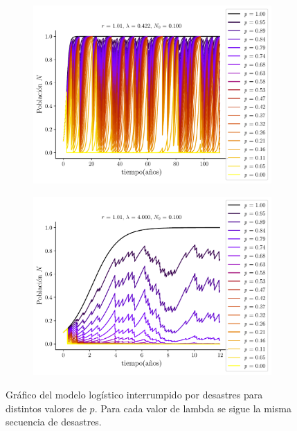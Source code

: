 \documentclass[twocolumn,aps,prl]{revtex4-1}
\begin{document}
\begin{figure}[ht!]
    \centering
    \begin{subfigure}[b]{0.495\linewidth}
        \centering
        \includegraphics[width = 0.999\textwidth]{scripts/plots/ex5-02.pdf}
        \caption{}
        \label{fig:scripts/plots/ex5-02}
    \end{subfigure}
    \begin{subfigure}[b]{0.495\linewidth}
        \includegraphics[width = 0.999\textwidth]{scripts/plots/ex5-19.pdf}
        \caption{}
        \label{fig:scripts/plots/ex5-19}
    \end{subfigure}
    \caption{Gráfico del modelo logístico interrumpido por desastres para distintos valores de $p$. Para cada valor de lambda se sigue la misma secuencia de desastres.}
    \label{fig:scripts/plots/ex5}
\end{figure}
\end{document}
